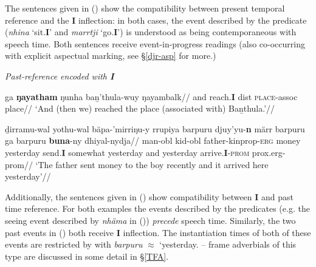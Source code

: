 The sentences given in () show the compatibility between present temporal reference and the \textbf{I} inflection: in both cases, the event described by the predicate (\textit{nhina} `sit.\textbf{I}' and \textit{marrtji} `go.\textbf{I}') is understood as being contemporaneous with speech time. Both sentences receive event-in-progress readings (also co-occurring with explicit aspectual marking, see §\ref{djr-asp} for more.)

\pex \textit{Past-reference encoded with \textbf{I}}



\a{}\begingl\gla ga \textbf{ŋayatham} ŋunha baṉ'thula-wuy ŋayambalk//
\glb and reach.\textbf{I} \gls{dist} \textsc{place}-\gls{assoc} place//
\glft`And (then we) reached the place (associated with) Baṉthula.'//\endgl



\a{}\begingl\gla ḏirramu-wal yothu-wal bäpa-'mirriŋu-y rrupiya barpuru djuy'yu-\textbf{n} märr barpuru ga barpuru \textbf{buna}-ny dhiyal-nydja//
\glb man-\gls{obl} kid-\gls{obl} father-\gls{kinprop}-\textsc{erg} money yesterday send.\textbf{I} somewhat yesterday and yesterday arrive.\textbf{I}-\textsc{prom} \gls{prox}.\gls{erg}-\gls{prom}//
\glft`The father sent money to the boy recently and it arrived here yesterday'//\endgl

\xe

Additionally, the sentences given in () show compatibility between \textbf{I} and past time reference. For both examples the events described by the predicates (e.g. the seeing event described by \textit{nhäma} in ()) \textit{precede} speech time. Similarly, the two past events in () both receive \textbf{I} inflection. The instantiation times of both of these events are restricted by with \textit{barpuru} $\approx$ `yesterday. -- frame adverbials of this type are discussed in some detail in §\ref{TFA}.

